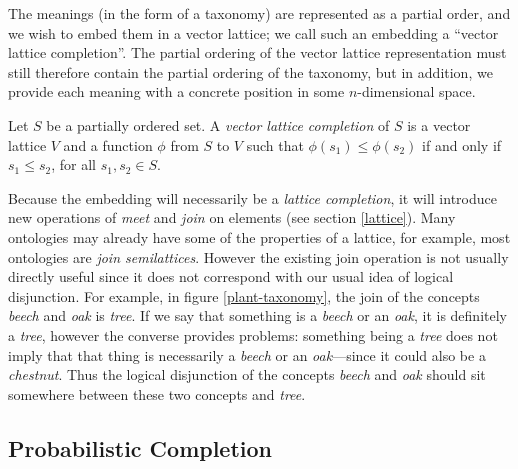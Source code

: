 \documentclass{report}
\begin{document}
The meanings (in the form of a taxonomy) are represented as a partial order, and we wish to embed them in a vector lattice; we call such an embedding a ``vector lattice completion''. The partial ordering of the vector lattice representation must still therefore contain the partial ordering of the taxonomy, but in addition, we provide each meaning with a concrete position in some $n$-dimensional space.

\begin{defn}
Let $S$ be a partially ordered set. A \emph{vector lattice completion} of $S$ is a vector lattice $V$ and a function $\phi$ from $S$ to $V$ such that $\phi(s_1) \le \phi(s_2)$ if and only if $s_1 \le s_2$, for all $s_1, s_2 \in S$.
\end{defn}

Because the embedding will necessarily be a \emph{lattice completion}, it will introduce new operations of \emph{meet} and \emph{join} on elements (see section \ref{lattice}). Many ontologies may already have some of the properties of a lattice, for example, most ontologies are \emph{join semilattices}. However the existing join operation is not usually directly useful since it does not correspond with our usual idea of logical disjunction. For example, in figure \ref{plant-taxonomy}, the join of the concepts \emph{beech} and \emph{oak} is \emph{tree}. If we say that something is a \emph{beech} or an \emph{oak}, it is definitely a \emph{tree}, however the converse provides problems: something being a \emph{tree} does not imply that that thing is necessarily a \emph{beech} or an \emph{oak}---since it could also be a \emph{chestnut}. Thus the logical disjunction of the concepts \emph{beech} and \emph{oak} should sit somewhere between these two concepts and \emph{tree}.

\subsection{Probabilistic Completion}
\end{document}
